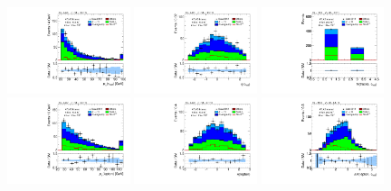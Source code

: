 \clearpage
\begin{figure}[tp]
  \centering
  \includegraphics[width=0.32\textwidth]{figures/analysis/vbf-topCR/tau-pt}
  \includegraphics[width=0.32\textwidth]{figures/analysis/vbf-topCR/tau-eta}
  \includegraphics[width=0.32\textwidth]{figures/analysis/vbf-topCR/tau-numTrack}
  \includegraphics[width=0.32\textwidth]{figures/analysis/vbf-topCR/lep-pt-hi}
  \includegraphics[width=0.32\textwidth]{figures/analysis/vbf-topCR/lep-eta}
  \includegraphics[width=0.32\textwidth]{figures/analysis/vbf-topCR/taulep-dR}

\end{figure}

